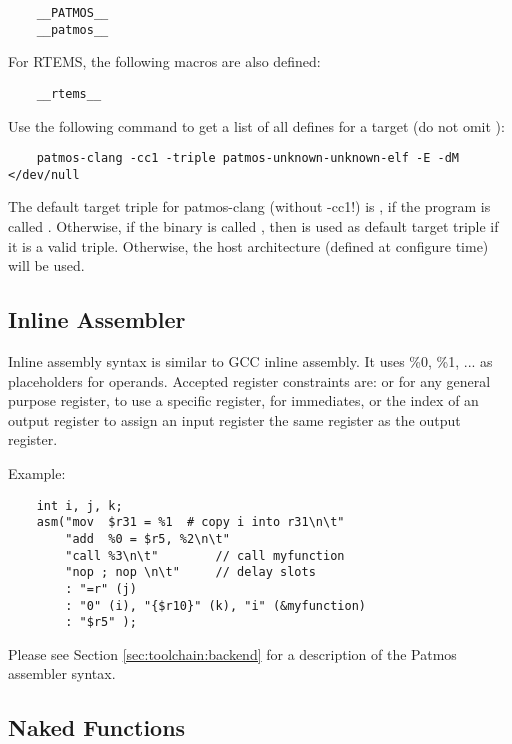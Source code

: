 \begin{verbatim}
    __PATMOS__
    __patmos__
\end{verbatim}

For RTEMS, the following macros are also defined:

\begin{verbatim}
    __rtems__
\end{verbatim}

Use the following command to get a list of all defines for a target (do not omit ):

\begin{verbatim}
    patmos-clang -cc1 -triple patmos-unknown-unknown-elf -E -dM </dev/null
\end{verbatim}

The default target triple for patmos-clang (without -cc1!) is ,
if the program is called . Otherwise, if the binary is called
, then  is used as default target triple if it is a valid triple.
Otherwise, the host architecture (defined at configure time) will be used.


\subsection{Inline Assembler}

Inline assembly syntax is similar to GCC inline assembly. It uses \%0, \%1, ... as placeholders for
operands. Accepted register constraints are:  or  for any general purpose register,
 to use a specific register,  for immediates, or the index of an output register to
assign an input register the same register as the output register.

Example:
\begin{verbatim}
    int i, j, k;
    asm("mov  $r31 = %1  # copy i into r31\n\t"
        "add  %0 = $r5, %2\n\t"
        "call %3\n\t"        // call myfunction
        "nop ; nop \n\t"     // delay slots
        : "=r" (j)
        : "0" (i), "{$r10}" (k), "i" (&myfunction)
        : "$r5" );
\end{verbatim}

Please see Section \ref{sec:toolchain:backend} for a description of the Patmos assembler syntax.

\subsection{Naked Functions}


